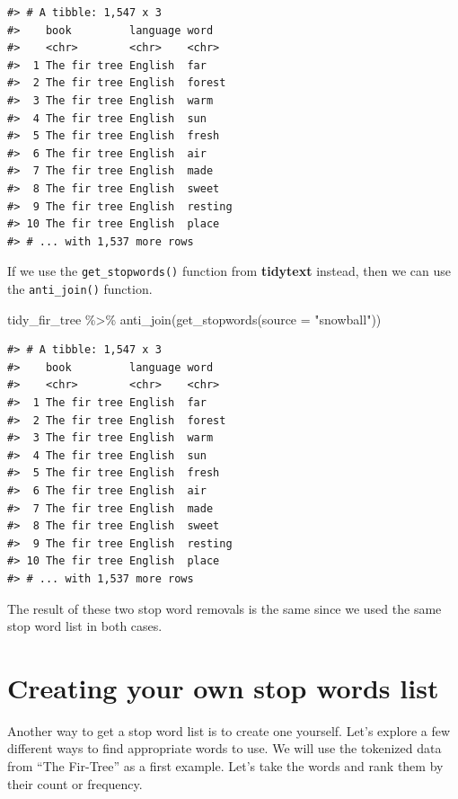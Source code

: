 \documentclass[
]{krantz}
\makeatletter
\newenvironment{Shaded}{\begin{snugshade}}{\end{snugshade}}
\newcommand{\AttributeTok}[1]{\textcolor[rgb]{0.77,0.63,0.00}{#1}}
\newcommand{\FunctionTok}[1]{\textcolor[rgb]{0.00,0.00,0.00}{#1}}
\newcommand{\NormalTok}[1]{#1}
\newcommand{\SpecialCharTok}[1]{\textcolor[rgb]{0.00,0.00,0.00}{#1}}
\newcommand{\StringTok}[1]{\textcolor[rgb]{0.31,0.60,0.02}{#1}}
\newenvironment{kframe}{%
\medskip{}
\setlength{\fboxsep}{.8em}
 \def\at@end@of@kframe{}%
 \ifinner\ifhmode%
  \def\at@end@of@kframe{\end{minipage}}%
  \begin{minipage}{\columnwidth}%
 \fi\fi%
 \def\FrameCommand##1{\hskip\@totalleftmargin \hskip-\fboxsep
 \colorbox{shadecolor}{##1}\hskip-\fboxsep
     \hskip-\linewidth \hskip-\@totalleftmargin \hskip\columnwidth}%
 \MakeFramed {\advance\hsize-\width
   \@totalleftmargin\z@ \linewidth\hsize
   \@setminipage}}%
 {\par\unskip\endMakeFramed%
 \at@end@of@kframe}
\renewenvironment{Shaded}{\begin{kframe}}{\end{kframe}}
\makeatother
\begin{document}
\begin{verbatim}
#> # A tibble: 1,547 x 3
#>    book         language word   
#>    <chr>        <chr>    <chr>  
#>  1 The fir tree English  far    
#>  2 The fir tree English  forest 
#>  3 The fir tree English  warm   
#>  4 The fir tree English  sun    
#>  5 The fir tree English  fresh  
#>  6 The fir tree English  air    
#>  7 The fir tree English  made   
#>  8 The fir tree English  sweet  
#>  9 The fir tree English  resting
#> 10 The fir tree English  place  
#> # ... with 1,537 more rows
\end{verbatim}

If we use the \texttt{get\_stopwords()} function from \textbf{tidytext} instead, then we can use the \texttt{anti\_join()} function.

\begin{Shaded}
\begin{Highlighting}[]
\NormalTok{tidy\_fir\_tree }\SpecialCharTok{\%\textgreater{}\%}
  \FunctionTok{anti\_join}\NormalTok{(}\FunctionTok{get\_stopwords}\NormalTok{(}\AttributeTok{source =} \StringTok{"snowball"}\NormalTok{))}
\end{Highlighting}
\end{Shaded}

\begin{verbatim}
#> # A tibble: 1,547 x 3
#>    book         language word   
#>    <chr>        <chr>    <chr>  
#>  1 The fir tree English  far    
#>  2 The fir tree English  forest 
#>  3 The fir tree English  warm   
#>  4 The fir tree English  sun    
#>  5 The fir tree English  fresh  
#>  6 The fir tree English  air    
#>  7 The fir tree English  made   
#>  8 The fir tree English  sweet  
#>  9 The fir tree English  resting
#> 10 The fir tree English  place  
#> # ... with 1,537 more rows
\end{verbatim}

The result of these two stop word removals is the same since we used the same stop word list in both cases.

\hypertarget{homemadestopwords}{%
\section{Creating your own stop words list}\label{homemadestopwords}}

Another way to get a stop word list is to create one yourself. Let's explore a few different ways to find appropriate words to use. We will use the tokenized data from ``The Fir-Tree'' as a first example. Let's take the words and rank them by their count or frequency.
\end{document}
